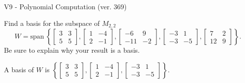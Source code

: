 \begin{exercise}
  \begin{exerciseTitle}V9 - Polynomial Computation (ver. 369)\end{exerciseTitle}
  \begin{exerciseStatement}
    Find a basis for the subspace of \(M_{2,2}\) 
\[W=\mathrm{span}\ \left\{\left[\begin{array}{cc}
3 & 3 \\
5 & 5
\end{array}\right] , \left[\begin{array}{cc}
1 & -4 \\
2 & -1
\end{array}\right] , \left[\begin{array}{cc}
-6 & 9 \\
-11 & -2
\end{array}\right] , \left[\begin{array}{cc}
-3 & 1 \\
-3 & -5
\end{array}\right] , \left[\begin{array}{cc}
7 & 2 \\
12 & 9
\end{array}\right]\right\}.\]
 Be sure to explain why your result is a basis.


  \end{exerciseStatement}
  \begin{exerciseAnswer}
   A basis of \(W\) is  \(\left\{\left[\begin{array}{cc}
3 & 3 \\
5 & 5
\end{array}\right] , \left[\begin{array}{cc}
1 & -4 \\
2 & -1
\end{array}\right] , \left[\begin{array}{cc}
-3 & 1 \\
-3 & -5
\end{array}\right]\right\}\).
  


  \end{exerciseAnswer}
\end{exercise}